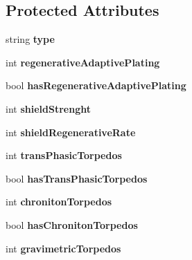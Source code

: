 \subsection*{Protected Attributes}
\begin{DoxyCompactItemize}
\item 
\hypertarget{classPVEEntity_a9350ded0194abfcd72d85abbfbecbd32}{
string {\bfseries type}}
\label{df/dde/classPVEEntity_a9350ded0194abfcd72d85abbfbecbd32}

\item 
\hypertarget{classPVEEntity_addcf75561353a6ef431d43885a151e1d}{
int {\bfseries regenerativeAdaptivePlating}}
\label{df/dde/classPVEEntity_addcf75561353a6ef431d43885a151e1d}

\item 
\hypertarget{classPVEEntity_ae3d2015f8baac0f8fc212161c1517446}{
bool {\bfseries hasRegenerativeAdaptivePlating}}
\label{df/dde/classPVEEntity_ae3d2015f8baac0f8fc212161c1517446}

\item 
\hypertarget{classPVEEntity_a396fed8d6238852b66352d695ed11883}{
int {\bfseries shieldStrenght}}
\label{df/dde/classPVEEntity_a396fed8d6238852b66352d695ed11883}

\item 
\hypertarget{classPVEEntity_a94f93d1a9277d988065f82343e93ba8e}{
int {\bfseries shieldRegenerativeRate}}
\label{df/dde/classPVEEntity_a94f93d1a9277d988065f82343e93ba8e}

\item 
\hypertarget{classPVEEntity_a973f8c6a700bf7cb6fb79c0a56605b07}{
int {\bfseries transPhasicTorpedos}}
\label{df/dde/classPVEEntity_a973f8c6a700bf7cb6fb79c0a56605b07}

\item 
\hypertarget{classPVEEntity_ae4a171aac4f61a935851caaf34b95a47}{
bool {\bfseries hasTransPhasicTorpedos}}
\label{df/dde/classPVEEntity_ae4a171aac4f61a935851caaf34b95a47}

\item 
\hypertarget{classPVEEntity_a2e5c5228cc55b72ab8b040f09633efd0}{
int {\bfseries chronitonTorpedos}}
\label{df/dde/classPVEEntity_a2e5c5228cc55b72ab8b040f09633efd0}

\item 
\hypertarget{classPVEEntity_a38f6e378fee4c59841aaeddab9aed149}{
bool {\bfseries hasChronitonTorpedos}}
\label{df/dde/classPVEEntity_a38f6e378fee4c59841aaeddab9aed149}

\item 
\hypertarget{classPVEEntity_a9b7aba9f178363860fa037a8b763360f}{
int {\bfseries gravimetricTorpedos}}
\label{df/dde/classPVEEntity_a9b7aba9f178363860fa037a8b763360f}


\end{DoxyCompactItemize}
